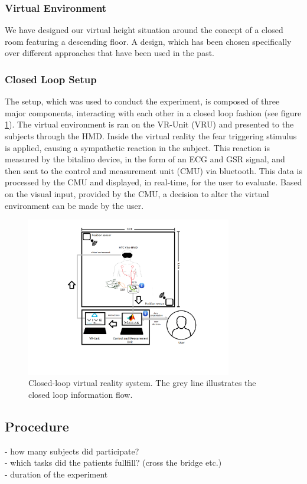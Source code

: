 \subsubsection{Virtual Environment}
We have designed our virtual height situation around the concept of a closed room featuring a descending floor. A design, which has been chosen specifically over different approaches that have been used in the past. 

\subsubsection{Closed Loop Setup}
The setup, which was used to conduct the experiment, is composed of three major components, interacting with each other in a closed loop fashion (see figure \ref{setupImg}). The virtual environment is ran on the VR-Unit (VRU) and presented to the subjects through the HMD. Inside the virtual reality the fear triggering stimulus is applied, causing a sympathetic reaction in the subject. This reaction is measured by the bitalino device, in the form of an ECG and GSR signal, and then sent to the control and measurement unit (CMU) via bluetooth. This data is processed by the CMU and displayed, in real-time, for the user to evaluate. Based on the visual input, provided by the CMU, a decision to alter the virtual environment can be made by the user.  

\begin{figure}[ht]
\centering
\includegraphics[width=0.8\textwidth]{images/setup.png}
\caption{Closed-loop virtual reality system. The grey line illustrates the closed loop information flow.}
\label{setupImg}
\end{figure}


\subsection{Procedure}
- how many subjects did participate?\\
- which tasks did the patients fullfill? (cross the bridge etc.)\\
- duration of the experiment\\

